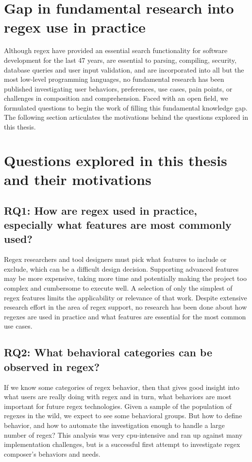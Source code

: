 \section{Gap in fundamental research into regex use in practice}

Although regex have provided an essential search functionality for software development for the last 47 years, are essential to parsing, compiling, security, database queries and user input validation, and are incorporated into all but the most low-level programming languages, no fundamental research has been published investigating user behaviors, preferences, use cases, pain points, or challenges in composition and comprehension.  Faced with an open field, we formulated  questions to begin the work of filling this fundamental knowledge gap.  The following section articulates the motivations behind the questions explored in this thesis.

\section{Questions explored in this thesis and their motivations}

\subsection{RQ1: How are regex used in practice, especially what features are most commonly used?}

Regex researchers and tool designers must pick what features to include or exclude, which  can be a difficult  design decision. Supporting advanced features may be more expensive, taking more time and potentially making the project too complex and cumbersome to execute well.  A selection of only the simplest of regex features limits the applicability or relevance of that work. Despite extensive research effort in the area of regex support,  no research has been done about how regexes are used in practice and what features are essential for the most common use cases.

\subsection{RQ2: What behavioral categories can be observed in regex?}
If we know some categories of regex behavior, then that gives good insight into what users are really doing with regex and in turn, what behaviors are most important for future regex technologies.  Given a sample of the population of regexes in the wild, we expect to see some behavioral groups.  But how to define behavior, and how to automate the investigation enough to handle a large number of regex?  This analysis was very cpu-intensive and ran up against many implementation challenges, but is a successful first attempt to investigate regex composer's behaviors and needs.

